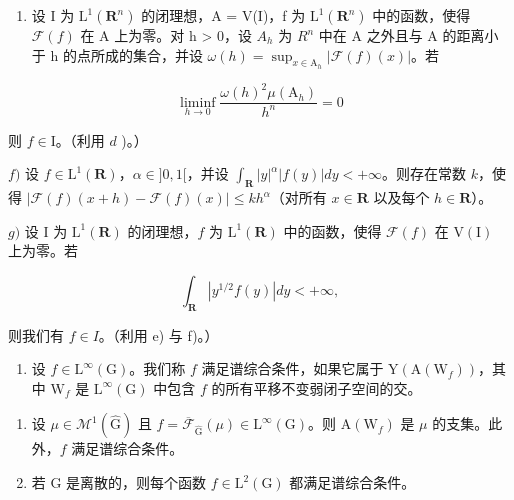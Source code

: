 \begin{enumerate}
\def\labelenumi{\alph{enumi})}
\setcounter{enumi}{4}
\tightlist
\item
  设 I 为 \(\mathrm{L}^{1}(\mathbf{R}^{n})\) 的闭理想，A = V(I)，f 为 \(\mathrm{L}^{1}(\mathbf{R}^{n})\) 中的函数，使得 \(\mathcal{F}(f)\) 在 A 上为零。对 h \textgreater{} 0，设 \(A_{h}\) 为 \(R^{n}\) 中在 A 之外且与 A 的距离小于 h 的点所成的集合，并设 \(\omega(h) = \sup_{x \in \mathrm{A}_{h}} |\mathcal{F}(f)(x)|\)。若
\end{enumerate}

\[
\liminf _ {h \to 0} \frac {\omega (h) ^ {2} \mu (\mathrm{A} _ {h})}{h ^ {n}} = 0
\]

则 \(f\in \mathrm{I}\)。（利用 \(d\) )。）

\(f)\) 设 \(f \in \mathrm{L}^{1}(\mathbf{R})\)，\(\alpha \in]0,1[\)，并设 \(\int_{\mathbf{R}} |y|^{\alpha}| f(y)| dy < +\infty\)。则存在常数 \(k\)，使得 \(|\mathcal{F}(f)(x+h)-\mathcal{F}(f)(x)| \leqslant kh^{\alpha}\)（对所有 \(x \in \mathbf{R}\) 以及每个 \(h \in \mathbf{R}\)）。

\(g)\) 设 I 为 \(\mathrm{L}^1 (\mathbf{R})\) 的闭理想，\(f\) 为 \(\mathrm{L}^1 (\mathbf{R})\) 中的函数，使得 \(\mathcal{F}(f)\) 在 \(\mathrm{V(I)}\) 上为零。若

\[
\int_ {\mathbf {R}} | y ^ {1 / 2} f (y) | d y <   + \infty ,
\]

则我们有 \(f \in I\)。（利用 e) 与 f)。）

\begin{enumerate}
\def\labelenumi{\arabic{enumi})}
\setcounter{enumi}{15}
\tightlist
\item
  设 \(f \in \mathrm{L}^{\infty}(\mathrm{G})\)。我们称 \(f\) 满足谱综合条件，如果它属于 \(\mathrm{Y}(\mathrm{A}(\mathrm{W}_f))\)，其中 \(\mathrm{W}_f\) 是 \(\mathrm{L}^{\infty}(\mathrm{G})\) 中包含 \(f\) 的所有平移不变弱闭子空间的交。
\end{enumerate}

\begin{enumerate}
\def\labelenumi{\alph{enumi})}
\item
  设 \(\mu \in \mathcal{M}^1 (\widehat{\mathrm{G}})\) 且 \(f = \overline{\mathcal{F}}_{\widehat{\mathrm{G}}}(\mu)\in \mathrm{L}^{\infty}(\mathrm{G})\)。则 \(\mathrm{A}(\mathrm{W}_f)\) 是 \(\mu\) 的支集。此外，\(f\) 满足谱综合条件。
\item
  若 G 是离散的，则每个函数 \(f \in \mathrm{L}^{2}(\mathrm{G})\) 都满足谱综合条件。
\end{enumerate}

